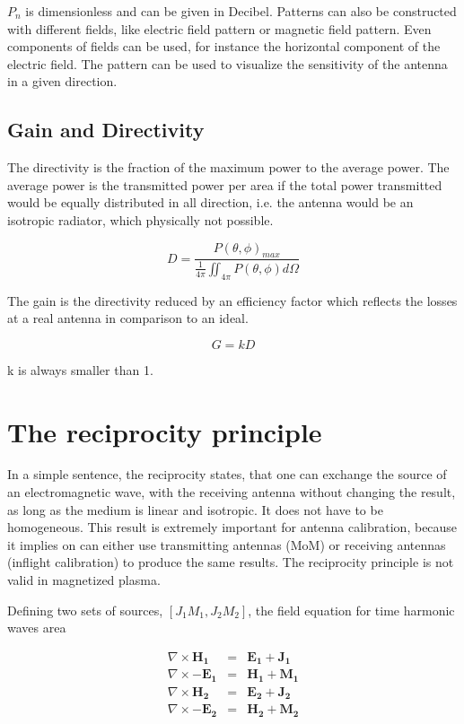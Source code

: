 \documentclass[a4paper,11pt]{report}
\begin{document}
$P_n$ is dimensionless and can be given in Decibel. Patterns can also be constructed with different fields, like electric field pattern or magnetic field pattern. Even components of fields can be used, for instance the horizontal component of the electric field. The pattern can be used to visualize the sensitivity of the antenna in a given direction.

\subsection{Gain and Directivity}
The directivity is the fraction of the maximum power to the average power. The average power is the transmitted power per area if the total power transmitted would be equally distributed in all direction, i.e. the antenna would be an isotropic radiator, which physically not possible.

\begin{equation}
 D=\frac{P(\theta,\phi)_{max}}{\frac{1}{4 \pi}\iint_{4\pi}P(\theta,\phi)d\Omega}
\end{equation}

The gain is the directivity reduced by an efficiency factor which reflects the losses at a real antenna in comparison to an ideal.

\begin{equation}
 G=kD
\end{equation}

k is always smaller than 1.

\section{The reciprocity principle}
In a simple sentence, the reciprocity states, that one can exchange the source of an electromagnetic wave, with the receiving antenna without changing the result, as long as the medium is linear and isotropic. It does not have to be homogeneous. This result is extremely important for antenna calibration, because it implies on can either use transmitting antennas (MoM) or receiving antennas (inflight calibration) to produce the same results. The reciprocity principle is not valid in magnetized plasma.

Defining two sets of sources, $[J_1 M_1, J_2 M_2]$, the field equation for time harmonic waves area

\begin{eqnarray}
 \nabla \times \mathbf{H_1} &=&  \mathbf{E_1}+ \mathbf{J_1}\\ \label{eq:rezifield1}
\nabla \times \mathbf{-E_1} &=&  \mathbf{H_1}+ \mathbf{M_1}\\
\nabla \times \mathbf{H_2} &=&  \mathbf{E_2}+ \mathbf{J_2}\\
\nabla \times \mathbf{-E_2} &=&  \mathbf{H_2}+ \mathbf{M_2} \label{eq:rezifield2}
\end{eqnarray}
\end{document}
